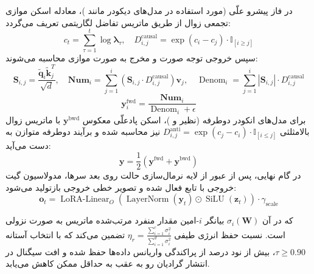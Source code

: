 در فاز پیشرو علّی (مورد استفاده در مدل‌های دیکودر مانند )، معادله اسکن موازی تجمعی زوال از طریق ماتریس تفاضل لگاریتمی تعریف می‌گردد:
\begin{equation}
c_t = \sum_{\tau=1}^t \log \boldsymbol{\lambda}_\tau, \quad D_{i, j}^{\text{causal}} = \exp\left(c_i - c_j\right) \cdot \mathbb{I}_{[i \ge j]}
\end{equation}
سپس خروجی توجه صورت و مخرج به صورت موازی محاسبه می‌شوند:
\begin{equation}
\mathbf{S}_{i, j} = \frac{\tilde{\mathbf{q}}_i \tilde{\mathbf{k}}_j^T}{\sqrt{d}}, \quad
\mathbf{Num}_i = \sum_{j=1}^i \left(\mathbf{S}_{i, j} \cdot D_{i, j}^{\text{causal}}\right) \mathbf{v}_j, \quad
\operatorname{Denom}_i = \sum_{j=1}^i |\mathbf{S}_{i, j}| \cdot D_{i, j}^{\text{causal}}
\end{equation}
\begin{equation}
\mathbf{y}_i^{\text{fwd}} = \frac{\mathbf{Num}_i}{\operatorname{Denom}_i + \epsilon}
\end{equation}
برای مدل‌های انکودر دوطرفه (نظیر  و )، اسکن پادعلّی معکوس $\mathbf{y}^{\text{bwd}}$ با ماتریس زوال بالامثلثی $D_{i, j}^{\text{anti}} = \exp(c_j - c_i) \cdot \mathbb{I}_{[i \le j]}$ نیز محاسبه شده و برآیند دوطرفه متوازن به دست می‌آید:
\begin{equation}
\mathbf{y} = \frac{1}{2} \left(\mathbf{y}^{\text{fwd}} + \mathbf{y}^{\text{bwd}}\right)
\end{equation}
در گام نهایی، پس از عبور از لایه نرمال‌سازی حالت  روی بعد سرها، مدولاسیون گیت خروجی با تابع  فعال شده و تصویر خطی خروجی بازتولید می‌شود:
\begin{equation}
\mathbf{o}_t = \operatorname{LoRA-Linear}_O\left( \operatorname{LayerNorm}(\mathbf{y}_t) \odot \operatorname{SiLU}(\mathbf{z}_t) \right) \cdot \gamma_{\text{scale}}
\end{equation}

که در آن $\sigma_i(\mathbf{W})$ بیانگر $i$-امین مقدار منفرد مرتب‌شده ماتریس به صورت نزولی است. نسبت حفظ انرژی طیفی $\eta_r = \frac{\sum_{i=1}^r \sigma_i^2}{\sum_{i=1}^{d} \sigma_i^2}$ تضمین می‌کند که با انتخاب آستانه $\tau \ge 0.90$، بیش از نود درصد از پراکندگی واریانس داده‌ها حفظ شده و افت سیگنال در انتشار گرادیان رو به عقب به حداقل ممکن کاهش می‌یابد.

